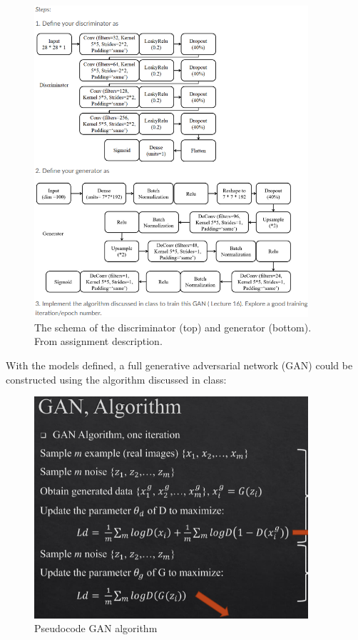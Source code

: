 \documentclass{article}
\begin{document}
\begin{figure}[H]
    \centering
    \includegraphics[width=4in]{csci-8110/hw-4/images/8110_hw4_diagram.png}
    \caption{The schema of the discriminator (top) and generator (bottom). From assignment description.}
    \label{fig:diagram}
\end{figure}

With the models defined, a full generative adversarial network (GAN) could be constructed using the algorithm discussed in class:

\begin{figure}[H]
    \centering
    \includegraphics[width=4in]{csci-8110/hw-4/images/8110_hw4_algorithm.png}
    \caption{Pseudocode GAN algorithm}
    \label{fig:algo}
\end{figure}
\end{document}
